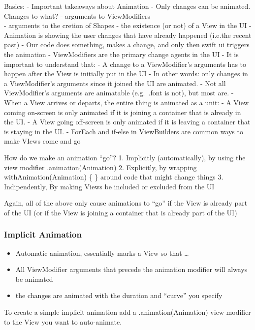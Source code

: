 \documentclass[]{article}
\providecommand{\tightlist}{%
  \setlength{\itemsep}{0pt}\setlength{\parskip}{0pt}}
\begin{document}
Basics: - Important takeaways about Animation - Only changes can be
animated. Changes to what? - arguments to ViewModifiers\\
- arguments to the cretion of Shapes - the existence (or not) of a View
in the UI - Animation is showing the user changes that have already
happened (i.e.the recent past) - Our code does something, makes a
change, and only then swift ui triggers the animation - ViewModifiers
are the primary change agents in the UI - It is important to understand
that: - A change to a ViewModifier's arguments has to happen after the
View is initially put in the UI - In other words: only changes in a
ViewModifier's arguments since it joined the UI are animated. - Not all
ViewModifier's arguments are animatable (e.g.~.font is not), but most
are. - When a View arrives or departs, the entire thing is animated as a
unit: - A View coming on-screen is only animated if it is joining a
container that is already in the UI. - A View going off-screen is only
animated if it is leaving a container that is staying in the UI. -
ForEach and if-else in ViewBuilders are common ways to make VIews come
and go

How do we make an animation ``go''? 1. Implicitly (automatically), by
using the view modifier .animation(Animation) 2. Explicitly, by wrapping
withAnimation(Animation) \{ \} around code that might change things 3.
Indipendently, By making Views be included or excluded from the UI

Again, all of the above only cause animations to ``go'' if the View is
already part of the UI (or if the View is joining a container that is
already part of the UI)

\hypertarget{implicit-animation}{%
\subsubsection{Implicit Animation}\label{implicit-animation}}

\begin{itemize}
\tightlist
\item
  Automatic animation, essentially marks a View so that \ldots{}
\item
  All ViewModifier arguments that precede the animation modifier will
  always be animated
\item
  the changes are animated with the duration and ``curve'' you specify
\end{itemize}

To create a simple implicit animation add a .animation(Animation) view
modifier to the View you want to auto-animate.
\end{document}

